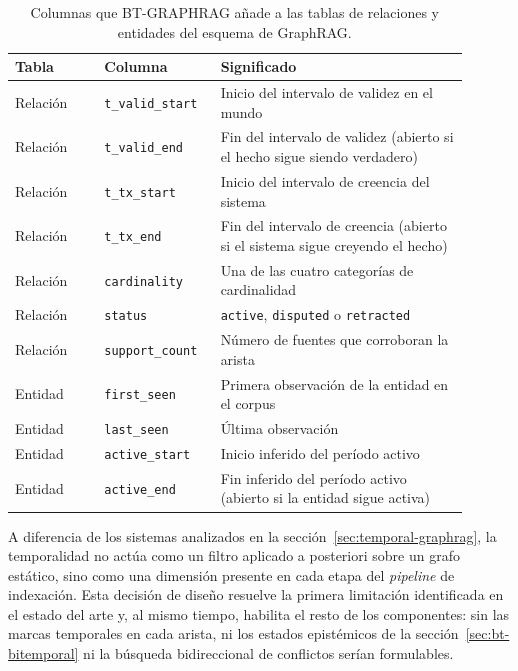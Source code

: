 \begin{table}[h]
\centering
\small
\begin{tabular}{p{0.18\linewidth}p{0.22\linewidth}p{0.50\linewidth}}
\hline
\textbf{Tabla} & \textbf{Columna} & \textbf{Significado} \\ \hline
Relación & \texttt{t\_valid\_start} & Inicio del intervalo de validez en el mundo \\
Relación & \texttt{t\_valid\_end} & Fin del intervalo de validez (abierto si el hecho sigue siendo verdadero) \\
Relación & \texttt{t\_tx\_start} & Inicio del intervalo de creencia del sistema \\
Relación & \texttt{t\_tx\_end} & Fin del intervalo de creencia (abierto si el sistema sigue creyendo el hecho) \\
Relación & \texttt{cardinality} & Una de las cuatro categorías de cardinalidad \\
Relación & \texttt{status} & \texttt{active}, \texttt{disputed} o \texttt{retracted} \\
Relación & \texttt{support\_count} & Número de fuentes que corroboran la arista \\
Entidad  & \texttt{first\_seen} & Primera observación de la entidad en el corpus \\
Entidad  & \texttt{last\_seen} & Última observación \\
Entidad  & \texttt{active\_start} & Inicio inferido del período activo \\
Entidad  & \texttt{active\_end}   & Fin inferido del período activo (abierto si la entidad sigue activa) \\ \hline
\end{tabular}
\caption{Columnas que BT-GRAPHRAG añade a las tablas de relaciones y entidades del esquema de GraphRAG.}
\label{tab:bt-schema}
\end{table}

A diferencia de los sistemas analizados en la sección~\ref{sec:temporal-graphrag}, la temporalidad no actúa como un filtro aplicado a posteriori sobre un grafo estático, sino como una dimensión presente en cada etapa del \emph{pipeline} de indexación. Esta decisión de diseño resuelve la primera limitación identificada en el estado del arte y, al mismo tiempo, habilita el resto de los componentes: sin las marcas temporales en cada arista, ni los estados epistémicos de la sección~\ref{sec:bt-bitemporal} ni la búsqueda bidireccional de conflictos serían formulables.

